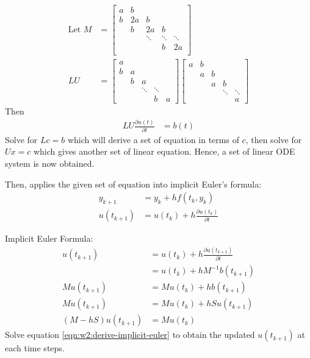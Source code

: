 \documentclass{article}
\begin{document}
\begin{align}
  \text{Let } M &= \begin{bmatrix}
    a & b \\
    b & 2a & b \\
     & b & 2a & b \\
     & & \ddots & \ddots & \ddots \\
     & & & b & 2a \\
  \end{bmatrix} \\
    LU &= \begin{bmatrix}
      a \\
      b & a \\
        & b & a \\
        & & \ddots & \ddots \\
        & & & b & a
    \end{bmatrix}
    \begin{bmatrix}
      a & b\\
        & a & b \\
        & & a & b \\
        & & & \ddots & \ddots \\
        & & & & a
    \end{bmatrix}
\end{align}
Then
\begin{align}
  LU \frac{\partial u(t)}{\partial t} &= b(t) 
\end{align}
Solve for $Lc = b$ which will derive a set of equation in terms of $c$, then solve for $Ux = c$ which gives another set of linear equation. Hence, a set of linear ODE system is now obtained.

Then, applies the given set of equation into implicit Euler's formula:
\begin{align}
  y_{k+1} &= y_k + hf(t_k, y_k) \\
  u(t_{k+1}) &= u(t_k) + h \frac{\partial u(t_k)}{\partial t} 
\end{align}

Implicit Euler Formula:
\begin{align}
  u(t_{k+1}) &= u(t_k) + h \frac{\partial u(t_{k+1})}{\partial t} \\
             &= u(t_k) + h M^{-1} b(t_{k+1}) \\
  M u(t_{k+1}) &= M u(t_k) + hb(t_{k+1}) \\
  M u(t_{k+1}) &= M u(t_k) + h S u(t_{k+1}) \\
  (M - h S) u(t_{k+1}) &= M u(t_k) \label{eqn:w2:derive-implicit-euler}
\end{align}
Solve equation \ref{eqn:w2:derive-implicit-euler} to obtain the updated $u(t_{k+1})$ at each time steps.
\end{document}
